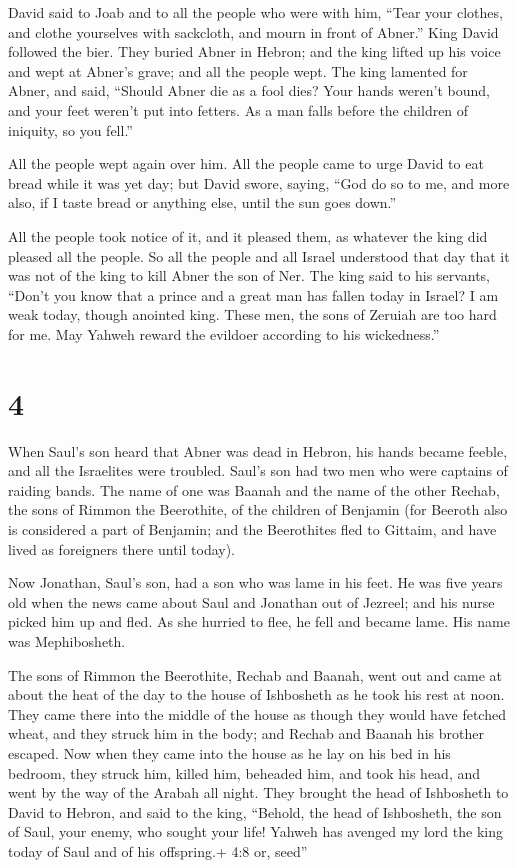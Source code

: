  David said to Joab and to all the people who were with
him, ``Tear your clothes, and clothe yourselves with sackcloth, and
mourn in front of Abner.'' King David followed the bier. 
They buried Abner in Hebron; and the king lifted up his voice and wept
at Abner's grave; and all the people wept.  The king
lamented for Abner, and said, ``Should Abner die as a fool dies?
 Your hands weren't bound, and your feet weren't put into
fetters. As a man falls before the children of iniquity, so you fell.''

All the people wept again over him.  All the people came to
urge David to eat bread while it was yet day; but David swore, saying,
``God do so to me, and more also, if I taste bread or anything else,
until the sun goes down.''

 All the people took notice of it, and it pleased them, as
whatever the king did pleased all the people.  So all the
people and all Israel understood that day that it was not of the king to
kill Abner the son of Ner.  The king said to his servants,
``Don't you know that a prince and a great man has fallen today in
Israel?  I am weak today, though anointed king. These men,
the sons of Zeruiah are too hard for me. May Yahweh reward the evildoer
according to his wickedness.''

\hypertarget{section-3}{%
\section{4}\label{section-3}}

 When Saul's son heard that Abner was dead in Hebron, his
hands became feeble, and all the Israelites were troubled. 
Saul's son had two men who were captains of raiding bands. The name of
one was Baanah and the name of the other Rechab, the sons of Rimmon the
Beerothite, of the children of Benjamin (for Beeroth also is considered
a part of Benjamin;  and the Beerothites fled to Gittaim,
and have lived as foreigners there until today).

 Now Jonathan, Saul's son, had a son who was lame in his
feet. He was five years old when the news came about Saul and Jonathan
out of Jezreel; and his nurse picked him up and fled. As she hurried to
flee, he fell and became lame. His name was Mephibosheth.

 The sons of Rimmon the Beerothite, Rechab and Baanah, went
out and came at about the heat of the day to the house of Ishbosheth as
he took his rest at noon.  They came there into the middle
of the house as though they would have fetched wheat, and they struck
him in the body; and Rechab and Baanah his brother escaped. 
Now when they came into the house as he lay on his bed in his bedroom,
they struck him, killed him, beheaded him, and took his head, and went
by the way of the Arabah all night.  They brought the head
of Ishbosheth to David to Hebron, and said to the king, ``Behold, the
head of Ishbosheth, the son of Saul, your enemy, who sought your life!
Yahweh has avenged my lord the king today of Saul and of his offspring.+
4:8 or, seed''

